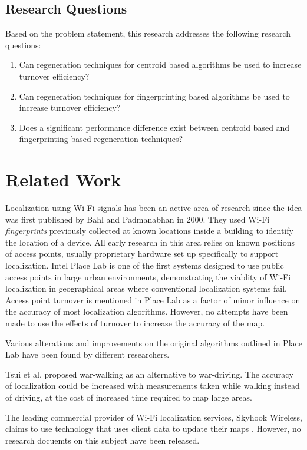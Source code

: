 \documentclass{sig-alternate-br}
\begin{document}
\subsection{Research Questions}
Based on the problem statement, this research addresses the following research questions:
\begin{enumerate}
\item 
Can regeneration techniques for centroid based algorithms be used to increase turnover efficiency?
\item
Can regeneration techniques for fingerprinting based algorithms be used to increase turnover efficiency?
\item
Does a significant performance difference exist between centroid based and fingerprinting based regeneration techniques?
\end{enumerate}

\section{Related Work}
Localization using Wi-Fi signals has been an active area of research since the idea was first published by Bahl and Padmanabhan \cite{bahl:radar} in 2000. They used Wi-Fi \textit{fingerprints} previously collected at known locations inside a building to identify the location of a device. All early research in this area relies on known positions of access points, usually proprietary hardware set up specifically to support localization. Intel Place Lab \cite{cheng:metropolitan-scale} is one of the first systems designed to use public access points in large urban environments, demonstrating the viablity of Wi-Fi localization in geographical areas where conventional localization systems fail. Access point turnover is mentioned in Place Lab as a factor of minor influence on the accuracy of most localization algorithms. However, no attempts have been made to use the effects of turnover to increase the accuracy of the map.

Various alterations and improvements on the original algorithms outlined in Place Lab have been found by different researchers. 

Tsui et al. \cite{tsui:war-walking} proposed war-walking as an alternative to war-driving. The accuracy of localization could be increased with measurements taken while walking instead of driving, at the cost of increased time required to map large areas.

The leading commercial provider of Wi-Fi localization services, Skyhook Wireless, claims to use technology that uses client data to update their maps \cite{skyhook:self-healing}. However, no research docuemts on this subject have been released.
\end{document}
